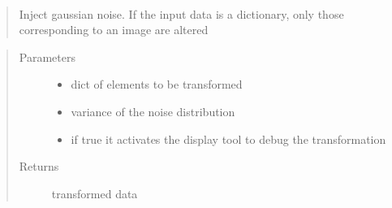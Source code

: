 \documentclass[letterpaper,10pt,english]{sphinxmanual}
\begin{document}
\begin{fulllineitems}
\label{\detokenize{ida_lib.operations:ida_lib.operations.transforms.inject_gaussian_noise}}~\begin{quote}

Inject gaussian noise. If the input data is a dictionary, only those corresponding to an image are altered
\end{quote}
\begin{quote}\begin{description}
\item[{Parameters}] \leavevmode\begin{itemize}
\item {} 
 \textendash{} dict of elements to be transformed

\item {} 
 \textendash{} variance of the noise distribution

\item {} 
 \textendash{} if true it activates the display tool to debug the transformation

\end{itemize}

\item[{Returns}] \leavevmode
transformed data

\end{description}\end{quote}

\end{fulllineitems}

\end{document}
